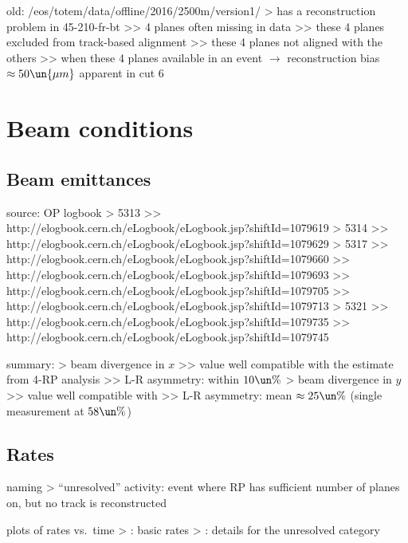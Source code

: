 \> old: /eos/totem/data/offline/2016/2500m/version1/
\>> has a reconstruction problem in 45-210-fr-bt
\>>> 4 planes often missing in data
\>>> these 4 planes excluded from track-based alignment
\>>> these 4 planes not aligned with the others
\>>> when these 4 planes available in an event $\rightarrow$ reconstruction bias $\approx 50\un{\mu m}$ apparent in cut 6


\chapter[beam-cond]{Beam conditions}

\section[beam-cond-emittance]{Beam emittances}

\> source: OP logbook
\>> 5313
\>>> http://elogbook.cern.ch/eLogbook/eLogbook.jsp?shiftId=1079619
\>> 5314
\>>> http://elogbook.cern.ch/eLogbook/eLogbook.jsp?shiftId=1079629
\>> 5317
\>>> http://elogbook.cern.ch/eLogbook/eLogbook.jsp?shiftId=1079660
\>>> http://elogbook.cern.ch/eLogbook/eLogbook.jsp?shiftId=1079693
\>>> http://elogbook.cern.ch/eLogbook/eLogbook.jsp?shiftId=1079705
\>>> http://elogbook.cern.ch/eLogbook/eLogbook.jsp?shiftId=1079713
\>> 5321
\>>> http://elogbook.cern.ch/eLogbook/eLogbook.jsp?shiftId=1079735
\>>> http://elogbook.cern.ch/eLogbook/eLogbook.jsp?shiftId=1079745

\> summary: 
\>> beam divergence in $x$
\>>> value well compatible with the estimate from 4-RP analysis
\>>> L-R asymmetry: within $10\un{\%}$
\>> beam divergence in $y$
\>>> value well compatible with 
\>>> L-R asymmetry: mean $\approx 25\un{\%}$ (single measurement at $58\un{\%}$)

\section[beam-cond-rates]{Rates}

\> naming
\>> ``unresolved'' activity: event where RP has sufficient number of planes on, but no track is reconstructed

\> plots of rates vs.~time
\>> : basic rates
\>> : details for the unresolved category

